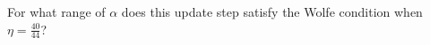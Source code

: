 For what range of $\alpha$ does this update step satisfy the Wolfe condition when $\eta = \frac{40}{44}$?

\begin{solution}
    \ \\
    \vfill
\end{solution}